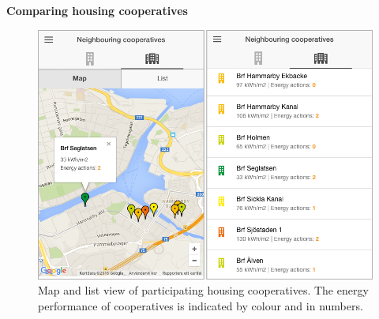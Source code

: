 \textbf{Comparing housing cooperatives}

\begin{figure}
	\centering
	\includegraphics[width=0.9\linewidth]{img/Figure202_Housing_cooperatives_comparison.png}
	\caption{Map and list view of participating housing cooperatives. The energy performance of cooperatives is indicated by colour and in numbers.}
	\label{fig:Figure202_Housing_cooperatives_comparison}
\end{figure}


